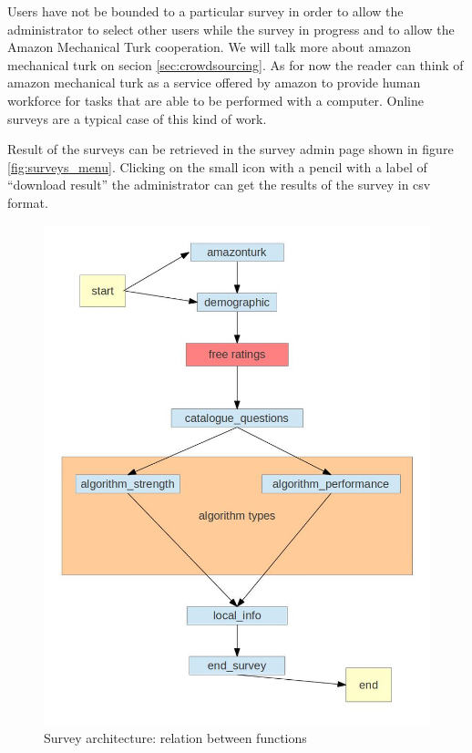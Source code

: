 Users have not be bounded to a particular survey in order to allow the administrator to select other users while the survey in progress and to allow the Amazon Mechanical Turk \cite{amazon-mechanical-turk} cooperation. We will talk more about amazon mechanical turk on secion \ref{sec:crowdsourcing}. As for now the reader can think of amazon mechanical turk as a service offered by amazon to provide human workforce for tasks that are able to be performed with a computer. Online surveys are a typical case of this kind of work.

Result of the surveys can be retrieved in the survey admin page shown in figure \ref{fig:surveys_menu}. Clicking on the small icon with a pencil with a label of ``download result'' the administrator can get the results of the survey in \ac{csv} format.

\begin{figure}
  \centering
  \includegraphics[width=\textwidth]{figures/movish_survey_architecture.jpg}
  \caption{Survey architecture: relation between functions}
  \label{fig:survey_architecture}
\end{figure}


